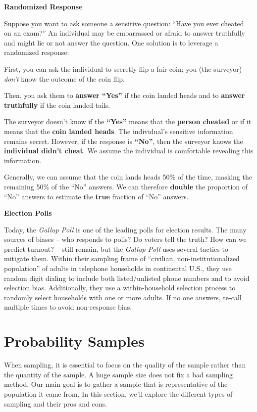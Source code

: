 \documentclass[
  letterpaper,
  DIV=11,
  numbers=noendperiod]{scrreprt}
\begin{document}
\textbf{Randomized Response}

Suppose you want to ask someone a sensitive question: ``Have you ever
cheated on an exam?'' An individual may be embarrassed or afraid to
answer truthfully and might lie or not answer the question. One solution
is to leverage a randomized response:

First, you can ask the individual to secretly flip a fair coin; you (the
surveyor) \emph{don't} know the outcome of the coin flip.

Then, you ask them to \textbf{answer ``Yes''} if the coin landed heads
and to \textbf{answer truthfully} if the coin landed tails.

The surveyor doesn't know if the \textbf{``Yes''} means that the
\textbf{person cheated} or if it means that the \textbf{coin landed
heads}. The individual's sensitive information remains secret. However,
if the response is \textbf{``No''}, then the surveyor knows the
\textbf{individual didn't cheat}. We assume the individual is
comfortable revealing this information.

Generally, we can assume that the coin lands heads 50\% of the time,
masking the remaining 50\% of the ``No'' answers. We can therefore
\textbf{double} the proportion of ``No'' answers to estimate the
\textbf{true} fraction of ``No'' answers.

\textbf{Election Polls}

Today, the \emph{Gallup Poll} is one of the leading polls for election
results. The many sources of biases -- who responds to polls? Do voters
tell the truth? How can we predict turnout? -- still remain, but the
\emph{Gallup Poll} uses several tactics to mitigate them. Within their
sampling frame of ``civilian, non-institutionalized population'' of
adults in telephone households in continental U.S., they use random
digit dialing to include both listed/unlisted phone numbers and to avoid
selection bias. Additionally, they use a within-household selection
process to randomly select households with one or more adults. If no one
answers, re-call multiple times to avoid non-response bias.

\section{Probability Samples}\label{probability-samples}

When sampling, it is essential to focus on the quality of the sample
rather than the quantity of the sample. A huge sample size does not fix
a bad sampling method. Our main goal is to gather a sample that is
representative of the population it came from. In this section, we'll
explore the different types of sampling and their pros and cons.
\end{document}
